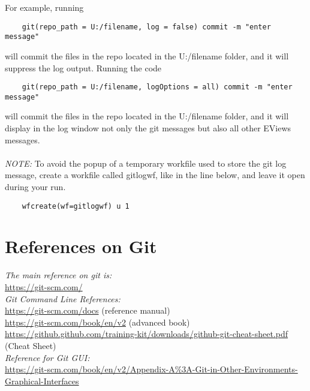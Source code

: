 \documentclass{article}
\begin{document}
For example, running
\begin{verbatim}
    git(repo_path = U:/filename, log = false) commit -m "enter message"
\end{verbatim}

will commit the files in the repo located in the U:/filename folder, and it will suppress the log output. Running the code 
\begin{verbatim}
    git(repo_path = U:/filename, logOptions = all) commit -m "enter message"
\end{verbatim}
will commit the files in the repo located in the U:/filename folder, and it will display in the log window not only the 
git messages but also all other EViews messages.
\\
\\
\emph{NOTE:} To avoid the popup of a temporary workfile used to store the git log message, create a workfile called gitlogwf, like in the line below, and leave it open during your run.  
\begin{verbatim}
    wfcreate(wf=gitlogwf) u 1
\end{verbatim}    


\newpage 

\section{References on Git}

 
 \emph{The main reference on git is:}
 \\ \indent  \url{https://git-scm.com/}  
 \\ \emph{Git Command Line References:}
 \\ \indent  \url{https://git-scm.com/docs}  (reference manual)
 \\ \indent  \url{https://git-scm.com/book/en/v2}  (advanced book)
 \\ \indent  \small{\url{https://github.github.com/training-kit/downloads/github-git-cheat-sheet.pdf}} (Cheat Sheet)
 \\\emph{Reference for Git GUI:}
 \\ \indent \small{ \url{https://git-scm.com/book/en/v2/Appendix-A%3A-Git-in-Other-Environments-Graphical-Interfaces}}
\end{document}

